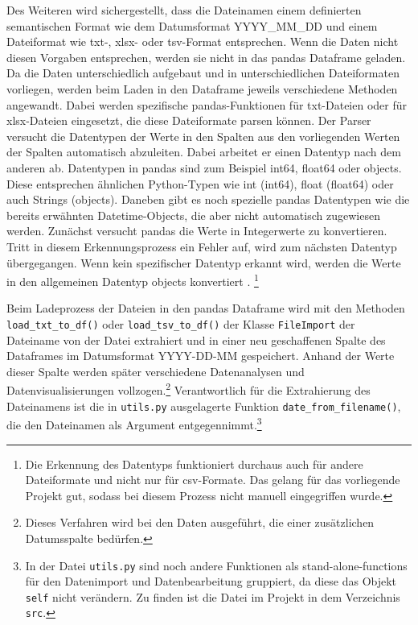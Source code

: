     Des Weiteren wird sichergestellt, dass die Dateinamen einem definierten semantischen Format wie dem Datumsformat YYYY\_MM\_DD und 
    einem Dateiformat wie txt-, xlsx- oder tsv-Format entsprechen. Wenn die Daten nicht diesen Vorgaben entsprechen, werden sie nicht in
    das pandas Dataframe geladen. Da die Daten unterschiedlich aufgebaut und in unterschiedlichen Dateiformaten vorliegen, 
    werden beim Laden in den Dataframe jeweils verschiedene Methoden angewandt. Dabei werden spezifische pandas-Funktionen für 
    txt-Dateien oder für xlsx-Dateien eingesetzt, die diese Dateiformate parsen können. 
    Der Parser versucht die Datentypen der Werte in den Spalten aus den vorliegenden Werten der Spalten automatisch abzuleiten. 
    Dabei arbeitet er einen Datentyp nach dem anderen ab. Datentypen in pandas sind zum Beispiel int64, float64 oder objects. 
    Diese entsprechen ähnlichen Python-Typen wie int (int64), float (float64) oder auch Strings (objects). Daneben gibt es noch spezielle pandas Datentypen wie die bereits erwähnten Datetime-Objects, die aber nicht automatisch zugewiesen werden.
    Zunächst versucht pandas die Werte in Integerwerte zu konvertieren. Tritt in diesem Erkennungsprozess ein Fehler auf, 
    wird zum nächsten Datentyp übergegangen. Wenn kein spezifischer Datentyp erkannt wird, werden die Werte in den allgemeinen Datentyp objects konvertiert \cite[vgl.][]{golubin_how_2021}.
    \footnote{Die Erkennung des Datentyps funktioniert durchaus auch für andere Dateiformate und nicht nur für csv-Formate. Das gelang für das vorliegende Projekt gut, sodass
    bei diesem Prozess nicht manuell eingegriffen wurde.}
    
    Beim Ladeprozess der Dateien in den pandas Dataframe wird mit den Methoden \texttt{load\_txt\_to\_df()} oder \texttt{load\_tsv\_to\_df()} 
    der Klasse \texttt{FileImport} der Dateiname von der Datei extrahiert und in einer neu geschaffenen Spalte des Dataframes im Datumsformat YYYY-DD-MM gespeichert.
    Anhand der Werte dieser Spalte werden später verschiedene Datenanalysen und Datenvisualisierungen vollzogen.\footnote{Dieses Verfahren wird bei den Daten ausgeführt, die einer zusätzlichen Datumsspalte bedürfen.} 
    Verantwortlich für die Extrahierung des Dateinamens ist die in \texttt{utils.py} ausgelagerte Funktion \texttt{date\_from\_filename()},
    die den Dateinamen als Argument entgegennimmt.\footnote{In der Datei \texttt{utils.py} sind noch andere Funktionen als stand-alone-functions für den Datenimport und Datenbearbeitung gruppiert,
    da diese das Objekt \texttt{self} nicht verändern. Zu finden ist die Datei im Projekt in dem Verzeichnis \texttt{src}.} 
    
